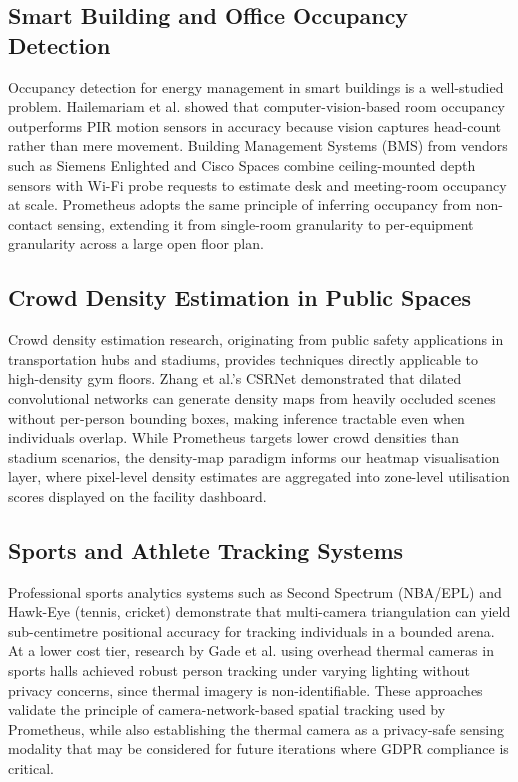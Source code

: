 \subsection{Smart Building and Office Occupancy Detection}
Occupancy detection for energy management in smart buildings is a well-studied problem. Hailemariam et al. showed that computer-vision-based room occupancy outperforms PIR motion sensors in accuracy because vision captures head-count rather than mere movement. Building Management Systems (BMS) from vendors such as Siemens Enlighted and Cisco Spaces combine ceiling-mounted depth sensors with Wi-Fi probe requests to estimate desk and meeting-room occupancy at scale. Prometheus adopts the same principle of inferring occupancy from non-contact sensing, extending it from single-room granularity to per-equipment granularity across a large open floor plan.

\subsection{Crowd Density Estimation in Public Spaces}
Crowd density estimation research, originating from public safety applications in transportation hubs and stadiums, provides techniques directly applicable to high-density gym floors. Zhang et al.'s CSRNet demonstrated that dilated convolutional networks can generate density maps from heavily occluded scenes without per-person bounding boxes, making inference tractable even when individuals overlap. While Prometheus targets lower crowd densities than stadium scenarios, the density-map paradigm informs our heatmap visualisation layer, where pixel-level density estimates are aggregated into zone-level utilisation scores displayed on the facility dashboard.

\subsection{Sports and Athlete Tracking Systems}
Professional sports analytics systems such as Second Spectrum (NBA/EPL) and Hawk-Eye (tennis, cricket) demonstrate that multi-camera triangulation can yield sub-centimetre positional accuracy for tracking individuals in a bounded arena. At a lower cost tier, research by Gade et al. using overhead thermal cameras in sports halls achieved robust person tracking under varying lighting without privacy concerns, since thermal imagery is non-identifiable. These approaches validate the principle of camera-network-based spatial tracking used by Prometheus, while also establishing the thermal camera as a privacy-safe sensing modality that may be considered for future iterations where GDPR compliance is critical.

